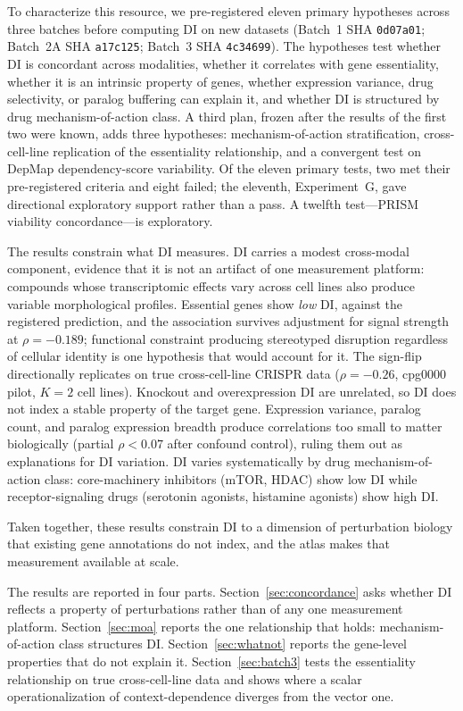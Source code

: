 \documentclass[11pt]{article}
\begin{document}
To characterize this resource, we pre-registered eleven primary
hypotheses across three batches before computing DI on new datasets
(Batch~1 SHA \texttt{0d07a01}; Batch~2A SHA \texttt{a17c125};
Batch~3 SHA \texttt{4c34699}).  The
hypotheses test whether DI is concordant across modalities,
whether it correlates with gene essentiality, whether it is an
intrinsic property of genes, whether expression variance,
drug selectivity, or paralog buffering can explain it, and whether
DI is structured by drug mechanism-of-action class.
A third plan, frozen after the results of the first two were known, adds three
hypotheses: mechanism-of-action stratification, cross-cell-line replication of
the essentiality relationship, and a convergent test on DepMap
dependency-score variability.
Of the eleven primary tests, two met their pre-registered criteria and
eight failed; the eleventh, Experiment~G, gave directional exploratory
support rather than a pass.  A twelfth test---PRISM viability
concordance---is exploratory.

The results constrain what DI measures.  DI carries a modest
cross-modal component, evidence that it is not an artifact of one measurement
platform: compounds whose transcriptomic effects vary across cell lines also
produce variable morphological profiles.  Essential genes show \emph{low} DI,
against the registered prediction, and the association survives adjustment for
signal strength at $\rho = -0.189$; functional constraint producing stereotyped
disruption regardless of cellular identity is one hypothesis that would account
for it.  The sign-flip directionally replicates on true cross-cell-line CRISPR
data ($\rho = -0.26$, cpg0000 pilot, $K = 2$ cell lines).  Knockout and
overexpression DI are unrelated, so DI does not index a stable property of the
target gene.  Expression variance, paralog count, and paralog expression breadth
produce correlations too small to matter biologically (partial
$\rho < 0.07$ after confound control), ruling them out as explanations
for DI variation.  DI varies systematically by drug mechanism-of-action
class: core-machinery inhibitors (mTOR, HDAC) show low DI while
receptor-signaling drugs (serotonin agonists, histamine agonists)
show high DI.

Taken together, these results constrain DI to a dimension of
perturbation biology that existing gene annotations do not index, and
the atlas makes that measurement available at scale.

The results are reported in four parts.  Section~\ref{sec:concordance} asks
whether DI reflects a property of perturbations rather than of any one
measurement platform.  Section~\ref{sec:moa} reports the one relationship that
holds: mechanism-of-action class structures DI.  Section~\ref{sec:whatnot}
reports the gene-level properties that do not explain it.
Section~\ref{sec:batch3} tests the essentiality relationship on true
cross-cell-line data and shows where a scalar operationalization of
context-dependence diverges from the vector one.
\end{document}
